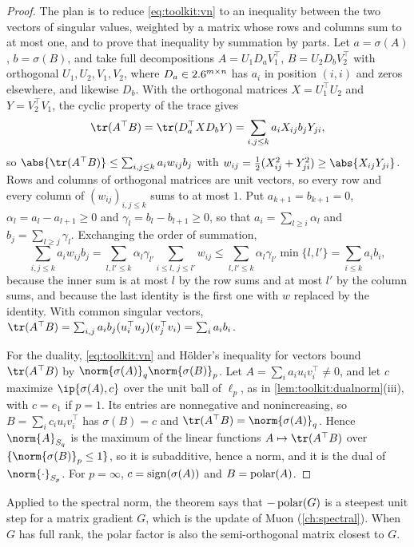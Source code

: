 \begin{refsection}
\begin{proof}
The plan is to reduce \eqref{eq:toolkit:vn} to an inequality between the two vectors of singular values, weighted by a matrix whose rows and columns sum to at most one, and to prove that inequality by summation by parts. Let $a=\sigma(A)$, $b=\sigma(B)$, and take full decompositions $A=U_1D_aV_1^\top$, $B=U_2D_bV_2^\top$ with orthogonal $U_1,U_2,V_1,V_2$, where $D_a\in2.6^{m\times n}$ has $a_i$ in position $(i,i)$ and zeros elsewhere, and likewise $D_b$. With the orthogonal matrices $X=U_1^\top U_2$ and $Y=V_2^\top V_1$, the cyclic property of the trace gives
\[
  \tr(A^\top B)=\tr(D_a^\top XD_bY)=\sum_{i,j\le k}a_iX_{ij}b_jY_{ji},
\]
so $\abs{\tr(A^\top B)}\le\sum_{i,j\le k}a_iw_{ij}b_j$ with $w_{ij}=\frac12(X_{ij}^2+Y_{ji}^2)\ge\abs{X_{ij}Y_{ji}}$. Rows and columns of orthogonal matrices are unit vectors, so every row and every column of $(w_{ij})_{i,j\le k}$ sums to at most $1$. Put $a_{k+1}=b_{k+1}=0$, $\alpha_l=a_l-a_{l+1}\ge0$ and $\gamma_l=b_l-b_{l+1}\ge0$, so that $a_i=\sum_{l\ge i}\alpha_l$ and $b_j=\sum_{l\ge j}\gamma_l$. Exchanging the order of summation,
\[
  \sum_{i,j\le k}a_iw_{ij}b_j=\sum_{l,l'\le k}\alpha_l\gamma_{l'}\sum_{i\le l,\,j\le l'}w_{ij}\le\sum_{l,l'\le k}\alpha_l\gamma_{l'}\min\{l,l'\}=\sum_{i\le k}a_ib_i ,
\]
because the inner sum is at most $l$ by the row sums and at most $l'$ by the column sums, and because the last identity is the first one with $w$ replaced by the identity. With common singular vectors, $\tr(A^\top B)=\sum_{i,j}a_ib_j(u_i^\top u_j)(v_j^\top v_i)=\sum_ia_ib_i$.

For the duality, \eqref{eq:toolkit:vn} and H\"older's inequality for vectors bound $\tr(A^\top B)$ by $\norm{\sigma(A)}_q\norm{\sigma(B)}_p$. Let $A=\sum_ia_iu_iv_i^\top\ne0$, and let $c$ maximize $\ip{\sigma(A),c}$ over the unit ball of $\ell_p$, as in \cref{lem:toolkit:dualnorm}(iii), with $c=e_1$ if $p=1$. Its entries are nonnegative and nonincreasing, so $B=\sum_ic_iu_iv_i^\top$ has $\sigma(B)=c$ and $\tr(A^\top B)=\norm{\sigma(A)}_q$. Hence $\norm{A}_{S_q}$ is the maximum of the linear functions $A\mapsto\tr(A^\top B)$ over $\{\norm{\sigma(B)}_p\le1\}$, so it is subadditive, hence a norm, and it is the dual of $\norm{\cdot}_{S_p}$. For $p=\infty$, $c=\operatorname{sign}(\sigma(A))$ and $B=\operatorname{polar}(A)$.
\end{proof}

Applied to the spectral norm, the theorem says that $-\operatorname{polar}(G)$ is a steepest unit step for a matrix gradient $G$, which is the update of Muon (\cref{ch:spectral}). When $G$ has full rank, the polar factor is also the semi-orthogonal matrix closest to $G$.


\end{refsection}
